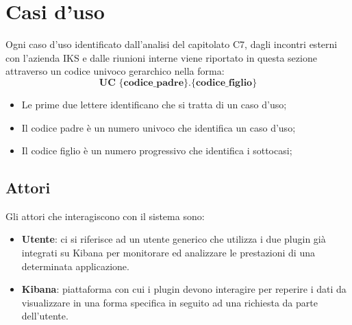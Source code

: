 \section{Casi d'uso}
Ogni caso d'uso identificato dall'analisi del capitolato C7, dagli incontri esterni con l'azienda IKS e dalle riunioni interne viene riportato in questa sezione attraverso un codice univoco gerarchico nella forma:
 $$ \textbf{UC \{codice\_padre\}.\{codice\_figlio\}  } $$
\begin{itemize}
	\item Le prime due lettere identificano che si tratta di un caso d'uso;
	\item Il codice padre è un numero univoco che identifica un caso d'uso;
	\item Il codice figlio è un numero progressivo che identifica i sottocasi;
\end{itemize}

\subsection{Attori}
Gli attori che interagiscono con il sistema sono:
\begin{itemize}
	\item \textbf{Utente}: ci si riferisce ad un utente generico che utilizza i due plugin già integrati su Kibana per monitorare ed analizzare le prestazioni di una determinata applicazione. 
	\item \textbf{Kibana}: piattaforma con cui i plugin devono interagire per reperire i dati da visualizzare in una forma specifica in seguito ad una richiesta da parte dell'utente.
\end{itemize}

